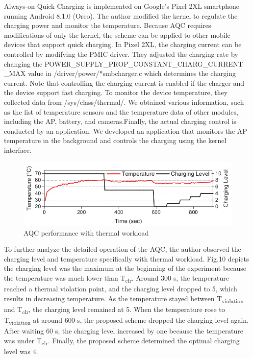 \documentclass[conference]{IEEEtran}
\begin{document}
Always-on Quick Charging is implemented on Google’s Pixel 2XL smartphone running Android 8.1.0 (Oreo). The author modified the kernel to regulate the charging power and monitor the temperature. Because AQC requires modifications of only the kernel, the scheme can be applied to other mobile devices that support quick charging. In Pixel 2XL, the charging current can be controlled by modifying the PMIC driver. They adjusted the charging rate by changing the POWER\_SUPPLY\_PROP\_CONSTANT\_CHARG\_CURRENT
\_MAX value in /driver/power/*smbcharger.c which determines the charging current. Note that controlling the charging current is enabled if the charger and the device support fast charging. To monitor the device temperature, they collected data from /sys/class/thermal/. We obtained various information, such as the list of temperature sensors and the temperature data of other modules, including the AP, battery, and cameras.Finally, the actual charging control is conducted by an application. We developed an application that monitors the AP temperature in the background and controls the charging using the kernel interface.

\begin{figure}[h!]
  \includegraphics[width=\linewidth]{images/image10.png}
  \caption{AQC performance with thermal workload\cite{b1}}
\end{figure}

To further analyze the detailed operation of the AQC, the author\cite{b1} observed the charging level and temperature specifically with thermal workload. Fig.10 depicts the charging level was the maximum at the beginning of the experiment because the temperature was much lower than T\textsubscript{clr}. Around 300 s, the temperature reached a thermal violation point, and the charging level dropped to 5, which results in decreasing temperature. As the temperature stayed between T\textsubscript{violation} and
T\textsubscript{clr}, the charging level remained at 5. When the temperature rose to T\textsubscript{violation} at around 600 s, the proposed scheme dropped the charging level again. After waiting 60 s, the charging level increased by one because the temperature was under T\textsubscript{clr}. Finally, the proposed scheme determined the optimal charging level was 4. \cite{b1}
\end{document}
